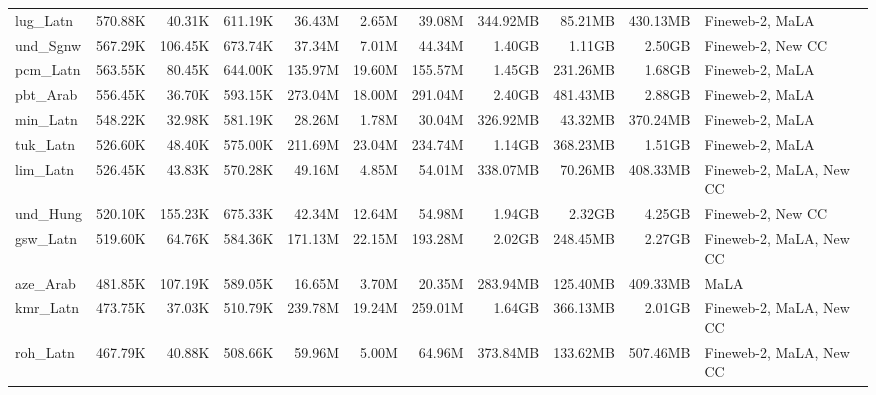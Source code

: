 \begin{table*}[!htp]
{\begin{tabular}{l|rrr|rrr|rrr|l}
lug\_Latn                   & 570.88K    & 40.31K       & 611.19K     & 36.43M       & 2.65M          & 39.08M        & 344.92MB   & 85.21MB      & 430.13MB    & Fineweb-2, MaLA         \\
und\_Sgnw                   & 567.29K    & 106.45K      & 673.74K     & 37.34M       & 7.01M          & 44.34M        & 1.40GB     & 1.11GB       & 2.50GB      & Fineweb-2, New CC       \\
pcm\_Latn                   & 563.55K    & 80.45K       & 644.00K     & 135.97M      & 19.60M         & 155.57M       & 1.45GB     & 231.26MB     & 1.68GB      & Fineweb-2, MaLA         \\
pbt\_Arab                   & 556.45K    & 36.70K       & 593.15K     & 273.04M      & 18.00M         & 291.04M       & 2.40GB     & 481.43MB     & 2.88GB      & Fineweb-2, MaLA         \\
min\_Latn                   & 548.22K    & 32.98K       & 581.19K     & 28.26M       & 1.78M          & 30.04M        & 326.92MB   & 43.32MB      & 370.24MB    & Fineweb-2, MaLA         \\
tuk\_Latn                   & 526.60K    & 48.40K       & 575.00K     & 211.69M      & 23.04M         & 234.74M       & 1.14GB     & 368.23MB     & 1.51GB      & Fineweb-2, MaLA         \\
lim\_Latn                   & 526.45K    & 43.83K       & 570.28K     & 49.16M       & 4.85M          & 54.01M        & 338.07MB   & 70.26MB      & 408.33MB    & Fineweb-2, MaLA, New CC \\
und\_Hung                   & 520.10K    & 155.23K      & 675.33K     & 42.34M       & 12.64M         & 54.98M        & 1.94GB     & 2.32GB       & 4.25GB      & Fineweb-2, New CC       \\
gsw\_Latn                   & 519.60K    & 64.76K       & 584.36K     & 171.13M      & 22.15M         & 193.28M       & 2.02GB     & 248.45MB     & 2.27GB      & Fineweb-2, MaLA, New CC \\
aze\_Arab                   & 481.85K    & 107.19K      & 589.05K     & 16.65M       & 3.70M          & 20.35M        & 283.94MB   & 125.40MB     & 409.33MB    & MaLA                    \\
kmr\_Latn                   & 473.75K    & 37.03K       & 510.79K     & 239.78M      & 19.24M         & 259.01M       & 1.64GB     & 366.13MB     & 2.01GB      & Fineweb-2, MaLA, New CC \\
roh\_Latn                   & 467.79K    & 40.88K       & 508.66K     & 59.96M       & 5.00M          & 64.96M        & 373.84MB   & 133.62MB     & 507.46MB    & Fineweb-2, MaLA, New CC \\

\end{tabular}}
\end{table*}
